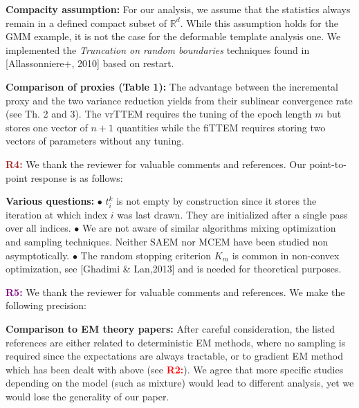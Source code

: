 \documentclass{article}
\begin{document}
\textbf{Compacity assumption:}  
For our analysis, we assume that the statistics always remain in a defined compact subset of $\mathbb{R}^d$.
While this assumption holds for the GMM example, it is not the case for the deformable template analysis one.
We implemented the \emph{Truncation on random boundaries} techniques found in [Allassonniere+, 2010] based on restart.

\textbf{Comparison of proxies (Table 1):} 
The advantage between the incremental proxy and the two variance reduction yields from their sublinear convergence rate (see Th. 2 and 3).
The vrTTEM requires the tuning of the epoch length $m$ but stores one vector of $n+1$ quantities while the fiTTEM requires storing two vectors of parameters without any tuning.\vspace{-0.05in}

\textbf{\textcolor{brown}{R4:}} We thank the reviewer for valuable comments and references. Our point-to-point response is as follows:\vspace{-0.05in}

\textbf{Various questions:} $\bullet$ $t_i^k$ is not empty by construction since it stores the iteration at which index $i$ was last drawn. 
They are initialized after a single pass over all indices.
$\bullet$ We are not aware of similar algorithms mixing optimization and sampling techniques. 
Neither SAEM nor MCEM have been studied non asymptotically.
$\bullet$ The random stopping criterion $K_m$ is common in non-convex optimization, see [Ghadimi \& Lan,2013] and is needed for theoretical purposes.\vspace{-0.05in}


\textbf{\textcolor{purple}{R5:}} We thank the reviewer for valuable comments and references. We make the following precision:\vspace{-0.05in}

\textbf{Comparison to EM theory papers:}
After careful consideration, the listed references are either related to deterministic EM methods, where no sampling is required since the expectations are always tractable, or to gradient EM method which has been dealt with above (see \textbf{\textcolor{red}{R2:}}).
We agree that more specific studies depending on the model (such as mixture) would lead to different analysis, yet we would lose the generality of our paper.
\end{document}

